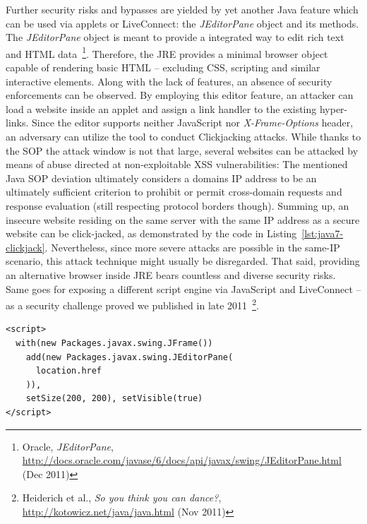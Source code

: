       Further security risks and bypasses are yielded by yet another Java feature which can be used via applets or LiveConnect: the \textit{JEditorPane} object and its methods. The \textit{JEditorPane} object is meant to provide a integrated way to edit rich text and HTML data~\footnote{Oracle, \textit{JEditorPane}, \url{http://docs.oracle.com/javase/6/docs/api/javax/swing/JEditorPane.html} (Dec 2011)}. Therefore, the JRE provides a minimal browser object capable of rendering basic HTML -- excluding CSS, scripting and similar interactive elements. Along with the lack of features, an absence of security enforcements can be observed. By employing this editor feature, an attacker can load a website inside an applet and assign a link handler to the existing hyper-links. Since the editor supports neither JavaScript nor \textit{X-Frame-Options} header, an adversary can utilize the tool to conduct Clickjacking attacks. While thanks to the SOP the attack window is not that large, several websites can be attacked by 
means of abuse directed at non-exploitable XSS vulnerabilities: The mentioned Java SOP deviation ultimately considers a domains IP address to be an ultimately sufficient criterion to prohibit or permit cross-domain requests and response evaluation (still respecting protocol borders though). Summing up, an insecure website residing on the same server with the same IP address as a secure website can be click-jacked, as demonstrated by the code in Listing~\ref{lst:java7-clickjack}. Nevertheless, since more severe attacks are possible in the same-IP scenario, this attack technique might usually be disregarded. That said, providing an alternative browser inside JRE bears countless and diverse security risks. Same goes for exposing a different script engine via JavaScript and LiveConnect -- as a security challenge proved we published in late 2011~\footnote{Heiderich et al., \textit{So you think you can dance?}, \url{http://kotowicz.net/java/java.html} (Nov 2011)}.\\

\begin{lstlisting}[captionpos=b,label=lst:java7-clickjack,caption=Clickjacking and X-Frame-Options bypass with Java 7; The JEditorPane object does not respect X-Frame-Options header settings]
<script>
  with(new Packages.javax.swing.JFrame())
    add(new Packages.javax.swing.JEditorPane(
      location.href
    )),
    setSize(200, 200), setVisible(true)
</script>
\end{lstlisting}

